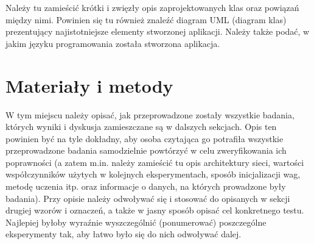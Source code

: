 \documentclass{classrep}
\begin{document}
{\color{blue}
Należy tu zamieścić krótki i zwięzły opis zaprojektowanych klas oraz powiązań
między nimi. Powinien się tu również znaleźć diagram UML  (diagram klas)
prezentujący najistotniejsze elementy stworzonej aplikacji. Należy także
podać, w jakim języku programowania została stworzona aplikacja. }

\section{Materiały i metody}
{\color{blue}
W tym miejscu należy opisać, jak przeprowadzone zostały wszystkie badania,
których wyniki i dyskusja zamieszczane są w dalszych sekcjach. Opis ten
powinien być na tyle dokładny, aby osoba czytająca go potrafiła wszystkie
przeprowadzone badania samodzielnie powtórzyć w celu zweryfikowania ich
poprawności (a zatem m.in. należy zamieścić tu opis architektury sieci,
wartości współczynników użytych w kolejnych eksperymentach, sposób
inicjalizacji wag, metodę uczenia itp. oraz informacje o danych, na których
prowadzone były badania). Przy opisie należy odwoływać się i stosować do
opisanych w sekcji drugiej wzorów i oznaczeń, a także w jasny sposób opisać
cel konkretnego testu. Najlepiej byłoby wyraźnie wyszczególnić (ponumerować)
poszczególne eksperymenty tak, aby łatwo było się do nich odwoływać dalej.}
\end{document}
